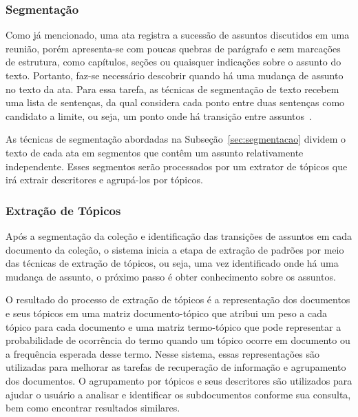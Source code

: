 







\subsubsection{Segmentação}

Como já mencionado, uma ata registra a sucessão de assuntos discutidos em uma reunião, porém apresenta-se com poucas quebras de parágrafo e sem marcações de estrutura, como capítulos, seções ou quaisquer indicações sobre o assunto do texto. Portanto, faz-se necessário descobrir quando há uma mudança de assunto no texto da ata. Para essa tarefa, as técnicas de segmentação de texto recebem uma lista de sentenças, da qual considera cada ponto entre duas sentenças como candidato a limite, ou seja, um ponto onde há transição entre assuntos~\cite{Bokaei2015, Bokaei2016, Misra2009, Sakahara2014}.


As técnicas de segmentação abordadas na Subseção~\ref{sec:segmentacao} dividem o texto de cada ata em segmentos que contêm um assunto relativamente independente. Esses segmentos serão processados por um extrator de tópicos que irá extrair descritores e agrupá-los por tópicos.





\subsubsection{Extração de Tópicos}

Após a segmentação da coleção e identificação das transições de assuntos em cada documento da coleção, o sistema inicia a etapa de extração de padrões por meio das técnicas de extração de tópicos, ou seja, uma vez identificado onde há uma mudança de assunto, o próximo passo é obter conhecimento sobre os assuntos.

O resultado do processo de extração de tópicos é a representação dos documentos e seus tópicos em uma matriz documento-tópico que atribui um peso a cada tópico para cada documento e uma matriz termo-tópico que pode representar a probabilidade de ocorrência do termo quando um tópico ocorre em documento ou a frequência esperada desse termo.  
Nesse sistema, essas representações são utilizadas para melhorar as tarefas de recuperação de informação e agrupamento dos documentos. 
O agrupamento por tópicos e seus descritores são utilizados para ajudar o usuário a analisar e identificar os subdocumentos conforme sua consulta, bem como encontrar resultados similares.

